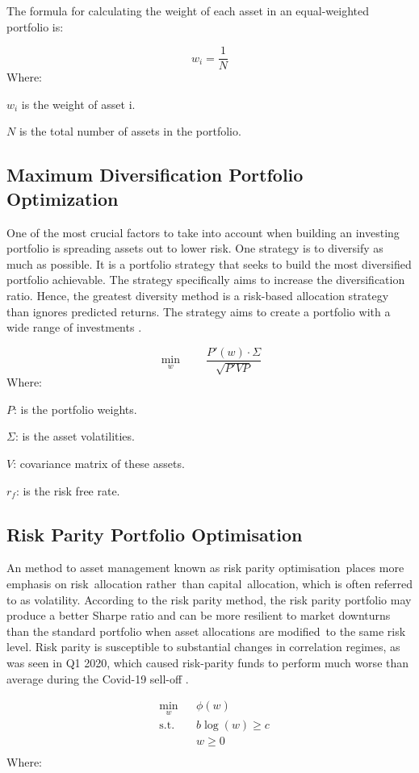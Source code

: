The formula for calculating the weight of each asset in an equal-weighted portfolio is:

\[w_i = \frac{1}{N}\]
Where:

$w_i$ is the weight of asset i.

$N$ is the total number of assets in the portfolio.

\subsection{Maximum Diversification Portfolio Optimization}
One of the most crucial factors to take into account when building an investing portfolio is spreading assets out to lower risk. One strategy is to diversify as much as possible. It is a portfolio strategy that seeks to build the most diversified portfolio achievable. The strategy specifically aims to increase the diversification ratio. Hence, the greatest diversity method is a risk-based allocation strategy than ignores predicted returns. The strategy aims to create a portfolio with a wide range of investments \citep{Theron2018}.

\[\underset{w}{\min}\qquad \frac{P' (w) \cdot \Sigma}{\sqrt{P'VP}}\]
Where:

$P$: is the portfolio weights.

$\Sigma$: is the asset volatilities.

$V$: covariance matrix of these assets.

$r_{f}$: is the risk free rate.\\

\subsection{Risk Parity Portfolio Optimisation}
An method to asset management known as risk parity optimisation places more emphasis on risk allocation rather than capital allocation, which is often referred to as volatility. According to the risk parity method, the risk parity portfolio may produce a better Sharpe ratio and can be more resilient to market downturns than the standard portfolio when asset allocations are modified to the same risk level. Risk parity is susceptible to substantial changes in correlation regimes, as was seen in Q1 2020, which caused risk-parity funds to perform much worse than average during the Covid-19 sell-off \citep{Feng2016}.

\[\begin{aligned}
&\underset{w}{\min} & & \phi(w) \\
&\text{s.t.} & & b \log(w) \geq c \\
& & & w \geq 0 \\
\end{aligned}\]
Where:

